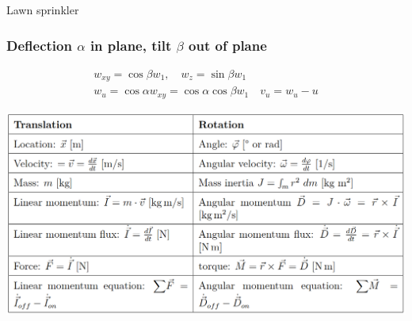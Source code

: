 \documentclass{article}
\begin{document}
\begin{multicols}{2}
\begin{examplebox}{Lawn sprinkler}
    \subsubsection{Deflection $\alpha$ in plane, tilt $\beta$ out of plane}
    \vspace*{-0.3cm}
    \begin{gather}
        w_{xy} = \cos\beta w_1, \quad w_z = \sin\beta w_1 \\
        w_u = \cos\alpha w_{xy} = \cos\alpha\cos\beta w_1 \quad v_u = w_u - u
    \end{gather}
\end{examplebox}
\end{multicols}

\newpage
\thispagestyle{empty}
\includegraphics[width=\textwidth]{media/angular_formulas.png}
\end{document}
